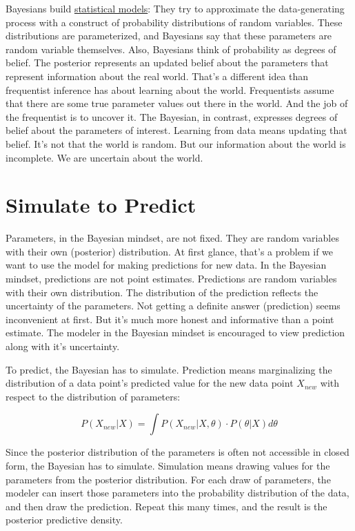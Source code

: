 \documentclass[
  10pt,
]{scrbook}
\begin{document}
Bayesians build \protect\hyperlink{statistical-modeling}{statistical models}:
They try to approximate the data-generating process with a construct of probability distributions of random variables.
These distributions are parameterized, and Bayesians say that these parameters are random variable themselves.
Also, Bayesians think of probability as degrees of belief.
The posterior represents an updated belief about the parameters that represent information about the real world.
That's a different idea than frequentist inference has about learning about the world.
Frequentists assume that there are some true parameter values out there in the world.
And the job of the frequentist is to uncover it.
The Bayesian, in contrast, expresses degrees of belief about the parameters of interest.
Learning from data means updating that belief.
It's not that the world is random.
But our information about the world is incomplete.
We are uncertain about the world.

\hypertarget{simulate-to-predict}{%
\section{Simulate to Predict}\label{simulate-to-predict}}

Parameters, in the Bayesian mindset, are not fixed.
They are random variables with their own (posterior) distribution.
At first glance, that's a problem if we want to use the model for making predictions for new data.
In the Bayesian mindset, predictions are not point estimates.
Predictions are random variables with their own distribution.
The distribution of the prediction reflects the uncertainty of the parameters.
Not getting a definite answer (prediction) seems inconvenient at first.
But it's much more honest and informative than a point estimate.
The modeler in the Bayesian mindset is encouraged to view prediction along with it's uncertainty.

To predict, the Bayesian has to simulate.
Prediction means marginalizing the distribution of a data point's predicted value for the new data point \(X_{new}\) with respect to the distribution of parameters:

\[P(X_{new} | X) = \int P(X_{new} | X, \theta) \cdot P(\theta | X) d\theta\]

Since the posterior distribution of the parameters is often not accessible in closed form, the Bayesian has to simulate.
Simulation means drawing values for the parameters from the posterior distribution.
For each draw of parameters, the modeler can insert those parameters into the probability distribution of the data, and then draw the prediction.
Repeat this many times, and the result is the posterior predictive density.
\end{document}
